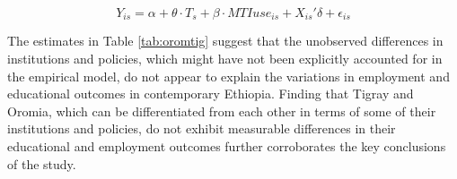 \begin{equation}\label{eq:03}
	Y_{is} = \alpha + \theta\cdot T_{s} + \beta\cdot MTIuse_{is} + X_{is}'\delta + \epsilon_{is}
\end{equation}


The estimates in Table \ref{tab:oromtig} suggest that the unobserved differences in institutions and policies, which might have not been explicitly accounted for in the empirical model, do not appear to explain the variations in employment and educational outcomes in contemporary Ethiopia.  Finding that Tigray and Oromia, which can be differentiated from each other in terms of some of their institutions and policies, do not exhibit measurable differences in their educational and employment outcomes further corroborates the key conclusions of the study. 













